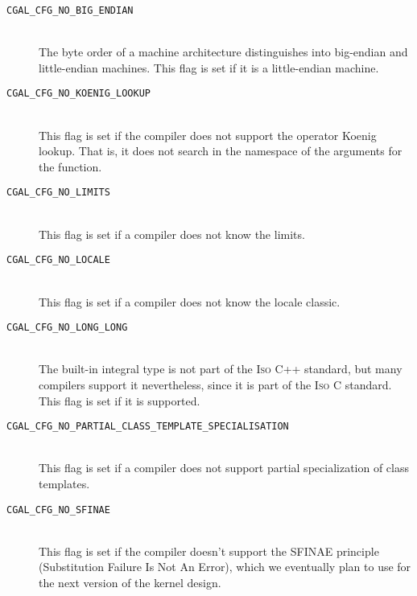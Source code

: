 \begin{description}
\item[{\tt CGAL\_CFG\_NO\_BIG\_ENDIAN}]~\\
  The byte order of a machine architecture distinguishes into
  big-endian and little-endian machines.  This flag is
  set if it is a little-endian machine.
 
\item[{\tt CGAL\_CFG\_NO\_KOENIG\_LOOKUP}]~\\
  This flag is set if the compiler does not support the operator
  Koenig lookup. That is, it does not search in the namespace of the
  arguments for the function.
 
\item[{\tt CGAL\_CFG\_NO\_LIMITS}]~\\
  This flag is set if a compiler does not know the limits.

\item[{\tt CGAL\_CFG\_NO\_LOCALE}]~\\
  This flag is set if a compiler does not know the locale classic. 

\item[{\tt CGAL\_CFG\_NO\_LONG\_LONG}]~\\
  The  built-in integral type is not part of the
  \textsc{Iso} C++ standard, but many compilers support it
  nevertheless, since it is part of the \textsc{Iso} C standard. This
  flag is set if it is supported.
  
\item[{\tt CGAL\_CFG\_NO\_PARTIAL\_CLASS\_TEMPLATE\_SPECIALISATION}]~\\
  This flag is set if a compiler does not support partial
  specialization of class templates.

\item[{\tt CGAL\_CFG\_NO\_SFINAE}]~\\ 
  This flag is set if the compiler doesn't support the SFINAE
  principle (Substitution Failure Is Not An Error), which we
  eventually plan to use for the next version of the kernel design.
 

\end{description}
